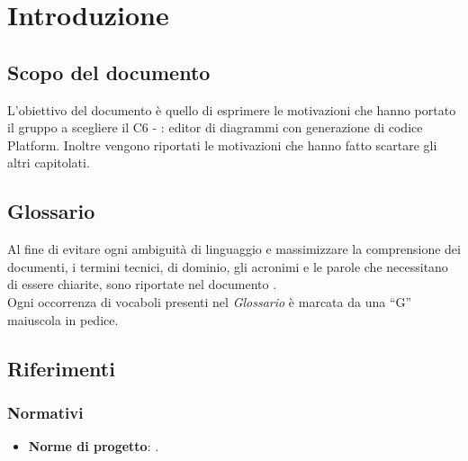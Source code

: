 \documentclass[../StudiodiFattibilita.tex]{subfiles}
\begin{document}
	\section{Introduzione}
		\subsection{Scopo del documento}
			L'obiettivo del documento è quello di esprimere le motivazioni che hanno portato il gruppo a scegliere il  C6 - \progetto: editor di diagrammi  con generazione di codice Platform.
			Inoltre vengono riportati le motivazioni che hanno fatto scartare gli altri capitolati.
		\subsection{Glossario}
			Al fine di evitare ogni ambiguità di linguaggio e massimizzare la
			comprensione dei documenti, i termini tecnici, di dominio, gli
			acronimi e le parole che necessitano di essere chiarite, sono
			riportate nel documento \glossariov.\\
			Ogni occorrenza di vocaboli presenti nel \textit{Glossario} è
			marcata da una ``G'' maiuscola in pedice.
		\subsection{Riferimenti}
			\subsubsection{Normativi}
			\begin{itemize}
				\item \textbf{Norme di progetto}: \normediprogettov.
			\end{itemize}
\end{document}
